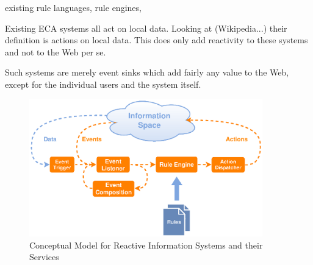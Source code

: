 existing rule languages, rule engines, 

Existing ECA systems all act on local data.
Looking at (Wikipedia...) their definition is actions on local data.
This does only add reactivity to these systems and not to the Web per se.

Such systems are merely event sinks which add fairly any value to the Web, except for the individual users and the system itself.

\begin{figure}[!ht]
  \centering
  \includegraphics[width=0.9\textwidth]{figures/Standard-Model-Template}
  \caption{Conceptual Model for Reactive Information Systems and their Services}
  \label{fig:Standard-Model-Template}
\end{figure}






